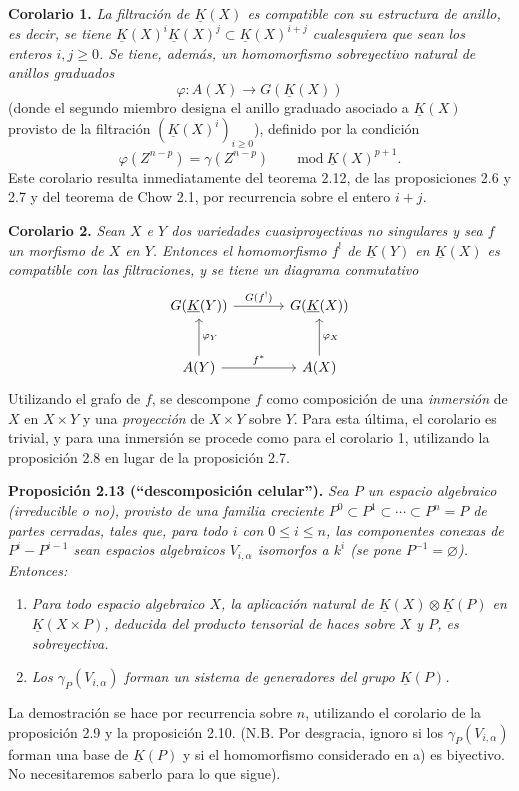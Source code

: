 \textbf{Corolario 1.} \emph{La filtración de $\underline K(X)$ es compatible con su estructura de anillo, es decir, se tiene $\underline K(X)^i\underline K(X)^j\subset\underline K(X)^{i+j}$ cualesquiera que sean los enteros $i,j\geq0$. Se tiene, además, un homomorfismo sobreyectivo natural de anillos graduados}
\begin{equation}\tag{2.34}
 \varphi:A(X)\longrightarrow G(\underline K(X))
\end{equation}
(donde el segundo miembro designa el anillo graduado asociado a $\underline K(X)$ provisto de la filtración $(\underline K(X)^i)_{i\geq0}$), definido por la condición
\[
 \varphi(Z^{n-p})=\gamma(Z^{n-p})\qquad\mathrm{mod}\ \underline K(X)^{p+1}.
\]
Este corolario resulta inmediatamente del teorema 2.12, de las proposiciones 2.6 y 2.7 y del teorema de Chow 2.1, por recurrencia sobre el entero $i+j$.

\textbf{Corolario 2.} \emph{Sean $X$ e $Y$ dos variedades cuasiproyectivas no singulares y sea $f$ un morfismo de $X$ en $Y$. Entonces el homomorfismo $f^!$ de $\underline K(Y)$ en $\underline K(X)$ es compatible con las filtraciones, y se tiene un diagrama conmutativo}
\[
\begin{tikzcd}[column sep=large,row sep=large]
G(\underline K(Y)) \arrow[r,"G(f^!)"] & G(\underline K(X))\\
A(Y) \arrow[r,"f^*"] \arrow[u,"\varphi_Y"'] & A(X) \arrow[u,"\varphi_X"']
\end{tikzcd}
\]
Utilizando el grafo de $f$, se descompone $f$ como composición de una \emph{inmersión} de $X$ en $X\times Y$ y una \emph{proyección} de $X\times Y$ sobre $Y$. Para esta última, el corolario es trivial, y para una inmersión se procede como para el corolario 1, utilizando la proposición 2.8 en lugar de la proposición 2.7.

\textbf{Proposición 2.13 (``descomposición celular'').} \emph{Sea $P$ un espacio algebraico (irreducible o no), provisto de una familia creciente $P^0\subset P^1\subset\cdots\subset P^n=P$ de partes cerradas, tales que, para todo $i$ con $0\leq i\leq n$, las componentes conexas de $P^i-P^{i-1}$ sean espacios algebraicos $V_{i,\alpha}$ isomorfos a $k^i$ (se pone $P^{-1}=\varnothing$). Entonces:}
\begin{enumerate}[label=\alph*)]
\item \emph{Para todo espacio algebraico $X$, la aplicación natural de $\underline K(X)\otimes\underline K(P)$ en $\underline K(X\times P)$, deducida del producto tensorial de haces sobre $X$ y $P$, es sobreyectiva.}
\item \emph{Los $\gamma_P(V_{i,\alpha})$ forman un sistema de generadores del grupo $\underline K(P)$.}
\end{enumerate}
La demostración se hace por recurrencia sobre $n$, utilizando el corolario de la proposición 2.9 y la proposición 2.10. (N.B. Por desgracia, ignoro si los $\gamma_P(V_{i,\alpha})$ forman una base de $\underline K(P)$ y si el homomorfismo considerado en a) es biyectivo. No necesitaremos saberlo para lo que sigue).

